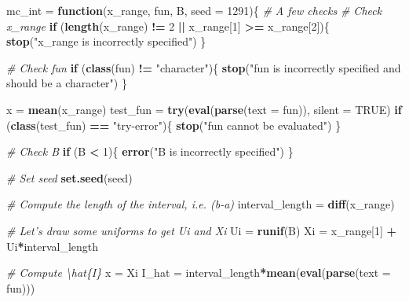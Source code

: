 \documentclass[12pt,]{krantz}
\newenvironment{Shaded}{\begin{snugshade}}{\end{snugshade}}
\newcommand{\KeywordTok}[1]{\textcolor[rgb]{0.27,0.27,0.27}{\textbf{#1}}}
\newcommand{\DataTypeTok}[1]{\textcolor[rgb]{0.27,0.27,0.27}{#1}}
\newcommand{\DecValTok}[1]{\textcolor[rgb]{0.06,0.06,0.06}{#1}}
\newcommand{\StringTok}[1]{\textcolor[rgb]{0.5,0.5,0.5}{#1}}
\newcommand{\CommentTok}[1]{\textcolor[rgb]{0.37,0.37,0.37}{\textit{#1}}}
\newcommand{\OtherTok}[1]{\textcolor[rgb]{0.37,0.37,0.37}{#1}}
\newcommand{\ControlFlowTok}[1]{\textcolor[rgb]{0.27,0.27,0.27}{\textbf{#1}}}
\newcommand{\OperatorTok}[1]{\textcolor[rgb]{0.43,0.43,0.43}{\textbf{#1}}}
\newcommand{\NormalTok}[1]{#1}
\begin{document}
\begin{Shaded}
\begin{Highlighting}[]
\NormalTok{mc_int =}\StringTok{ }\ControlFlowTok{function}\NormalTok{(x_range, fun, B, }\DataTypeTok{seed =} \DecValTok{1291}\NormalTok{)\{}
  \CommentTok{# A few checks}
  \CommentTok{# Check x_range}
  \ControlFlowTok{if}\NormalTok{ (}\KeywordTok{length}\NormalTok{(x_range) }\OperatorTok{!=}\StringTok{ }\DecValTok{2} \OperatorTok{||}\StringTok{ }\NormalTok{x_range[}\DecValTok{1}\NormalTok{] }\OperatorTok{>=}\StringTok{ }\NormalTok{x_range[}\DecValTok{2}\NormalTok{])\{}
    \KeywordTok{stop}\NormalTok{(}\StringTok{"x_range is incorrectly specified"}\NormalTok{)}
\NormalTok{  \}}

  \CommentTok{# Check fun}
  \ControlFlowTok{if}\NormalTok{ (}\KeywordTok{class}\NormalTok{(fun) }\OperatorTok{!=}\StringTok{ "character"}\NormalTok{)\{}
    \KeywordTok{stop}\NormalTok{(}\StringTok{"fun is incorrectly specified and should be a character"}\NormalTok{)}
\NormalTok{  \}}

\NormalTok{  x =}\StringTok{ }\KeywordTok{mean}\NormalTok{(x_range)}
\NormalTok{  test_fun =}\StringTok{ }\KeywordTok{try}\NormalTok{(}\KeywordTok{eval}\NormalTok{(}\KeywordTok{parse}\NormalTok{(}\DataTypeTok{text =}\NormalTok{ fun)), }\DataTypeTok{silent =} \OtherTok{TRUE}\NormalTok{)}
  \ControlFlowTok{if}\NormalTok{ (}\KeywordTok{class}\NormalTok{(test_fun) }\OperatorTok{==}\StringTok{ "try-error"}\NormalTok{)\{}
    \KeywordTok{stop}\NormalTok{(}\StringTok{"fun cannot be evaluated"}\NormalTok{)}
\NormalTok{  \}}

  \CommentTok{# Check B}
  \ControlFlowTok{if}\NormalTok{ (B }\OperatorTok{<}\StringTok{ }\DecValTok{1}\NormalTok{)\{}
    \KeywordTok{error}\NormalTok{(}\StringTok{"B is incorrectly specified"}\NormalTok{)}
\NormalTok{  \}}

  \CommentTok{# Set seed}
  \KeywordTok{set.seed}\NormalTok{(seed)}

  \CommentTok{# Compute the length of the interval, i.e. (b-a)}
\NormalTok{  interval_length =}\StringTok{ }\KeywordTok{diff}\NormalTok{(x_range)}

  \CommentTok{# Let's draw some uniforms to get Ui and Xi}
\NormalTok{  Ui =}\StringTok{ }\KeywordTok{runif}\NormalTok{(B)}
\NormalTok{  Xi =}\StringTok{ }\NormalTok{x_range[}\DecValTok{1}\NormalTok{] }\OperatorTok{+}\StringTok{ }\NormalTok{Ui}\OperatorTok{*}\NormalTok{interval_length}

  \CommentTok{# Compute \textbackslash{}hat\{I\}}
\NormalTok{  x =}\StringTok{ }\NormalTok{Xi}
\NormalTok{  I_hat =}\StringTok{ }\NormalTok{interval_length}\OperatorTok{*}\KeywordTok{mean}\NormalTok{(}\KeywordTok{eval}\NormalTok{(}\KeywordTok{parse}\NormalTok{(}\DataTypeTok{text =}\NormalTok{ fun)))}


\end{Highlighting}
\end{Shaded}
\end{document}
